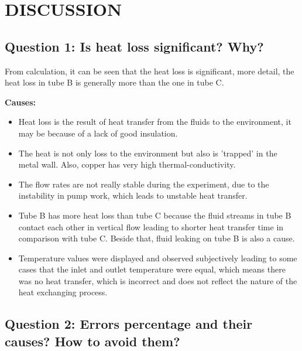 \section{DISCUSSION}\label{discussion}

\subsection*{Question 1: Is heat loss significant? Why?}\label{q1-heat-loss}

From calculation, it can be seen that the heat loss is significant, more detail, the heat loss in tube B is generally more than the one in tube C.

\textbf{Causes:}
\begin{itemize}
    \item Heat loss is the result of heat transfer from the fluids to the environment, it may be because of a lack of good insulation.
    \item The heat is not only loss to the environment but also is 'trapped' in the metal wall. Also, copper has very high thermal-conductivity.
    \item The flow rates are not really stable during the experiment, due to the instability in pump work, which leads to unstable heat transfer.
    \item Tube B has more heat loss than tube C because the fluid streams in tube B contact each other in vertical flow leading to shorter heat transfer time in comparison with tube C. Beside that, fluid leaking on tube B is also a cause.
    \item Temperature values were displayed and observed subjectively leading to some cases that the inlet and outlet temperature were equal, which means there was no heat transfer, which is incorrect and does not reflect the nature of the heat exchanging process.
\end{itemize}

\subsection*{Question 2: Errors percentage and their causes? How to avoid them?}\label{q2-errors}

